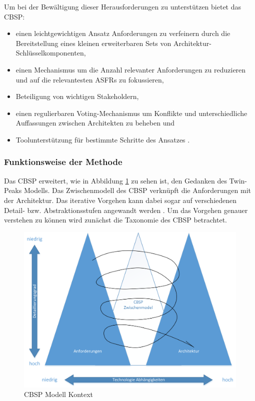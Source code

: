 Um bei der Bew\"altigung dieser Herausforderungen zu unterst\"utzen bietet das CBSP: \\

\begin{itemize}
\item einen leichtgewichtigen Ansatz Anforderungen zu verfeinern durch die Bereitstellung eines kleinen erweiterbaren Sets von Architektur-Schl\"usselkomponenten, 
\item einen Mechanismus um die Anzahl relevanter Anforderungen zu reduzieren und auf die relevantesten ASFRs zu fokussieren, 
\item Beteiligung von wichtigen Stakeholdern, 
\item einen regulierbaren Voting-Mechanismus um Konflikte und unterschiedliche Auffassungen zwischen Architekten zu beheben und
\item Toolunterst\"utzung f\"ur bestimmte Schritte des Ansatzes \cite{Gru01}. \\
\end{itemize}

\subsubsection{Funktionsweise der Methode}

Das CBSP erweitert, wie in Abbildung \ref{fig_cbsp_model} zu sehen ist, den Gedanken des Twin-Peaks Modells. Das Zwischenmodell des CBSP verkn\"upft die Anforderungen mit der Architektur. Das iterative Vorgehen kann dabei sogar auf verschiedenen Detail- bzw. Abstraktionsstufen angewandt werden \cite{Gru01}. 
Um das Vorgehen genauer verstehen zu k\"onnen wird zun\"achst die Taxonomie des CBSP betrachtet. \\

\begin{figure}[h]
	\centering
	\includegraphics[scale=0.5]{cbsp_model2.png} 
	\caption{CBSP Modell Kontext \cite{Gru01}}
	\label{fig_cbsp_model}
\end{figure}

